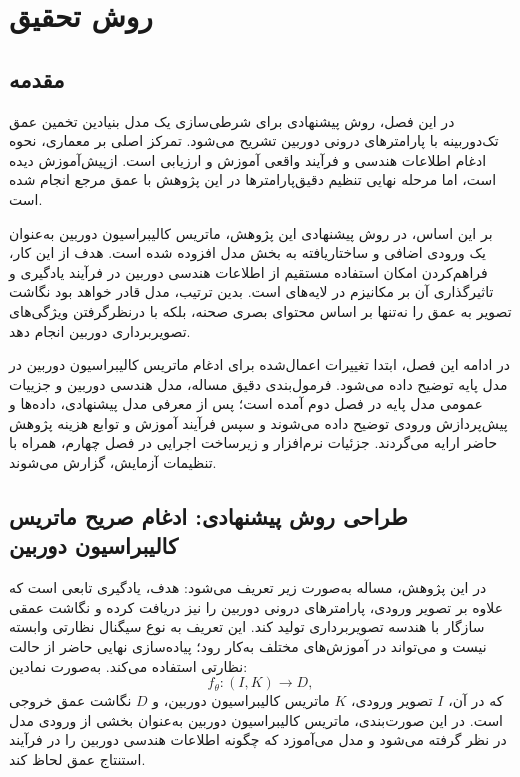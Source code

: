 \chapter{روش تحقیق}
\thispagestyle{fancy}\clearpage
\section{مقدمه}

در این فصل، روش پیشنهادی برای شرطی‌سازی یک مدل بنیادین تخمین عمق تک‌دوربینه با پارامترهای درونی دوربین تشریح می‌شود. تمرکز اصلی بر معماری، نحوه ادغام اطلاعات هندسی و فرآیند واقعی آموزش و ارزیابی است. \basemodel{} ازپیش‌آموزش دیده است، اما مرحله نهایی تنظیم دقیق‌پارامترها در این پژوهش با عمق مرجع انجام شده است.

بر این اساس، در روش پیشنهادی این پژوهش، ماتریس کالیبراسیون دوربین به‌عنوان یک ورودی اضافی و ساختاریافته به بخش  مدل افزوده شده است. هدف از این کار، فراهم‌کردن امکان استفاده مستقیم از اطلاعات هندسی دوربین در فرآیند یادگیری و تاثیرگذاری آن بر مکانیزم  در لایه‌های  است. بدین ترتیب، مدل قادر خواهد بود نگاشت تصویر به عمق را نه‌تنها بر اساس محتوای بصری صحنه، بلکه با درنظرگرفتن ویژگی‌های تصویربرداری دوربین انجام دهد.

در ادامه این فصل، ابتدا  تغییرات اعمال‌شده برای ادغام ماتریس کالیبراسیون دوربین در مدل پایه توضیح داده می‌شود. فرمول‌بندی دقیق مساله، مدل هندسی دوربین و جزییات عمومی مدل پایه در فصل دوم آمده است؛ پس از معرفی مدل پیشنهادی، داده‌ها و پیش‌پردازش ورودی توضیح داده می‌شوند و سپس فرآیند آموزش و توابع هزینه پژوهش حاضر ارایه می‌گردند. جزئیات نرم‌افزار و زیرساخت اجرایی در فصل چهارم، همراه با تنظیمات آزمایش، گزارش می‌شوند.









\section{طراحی روش پیشنهادی: ادغام صریح ماتریس کالیبراسیون دوربین}

در این پژوهش، مساله به‌صورت زیر تعریف می‌شود: هدف، یادگیری تابعی است که علاوه بر تصویر ورودی، پارامترهای درونی دوربین را نیز دریافت کرده و نگاشت عمقی سازگار با هندسه تصویربرداری تولید کند. این تعریف به نوع سیگنال نظارتی وابسته نیست و می‌تواند در آموزش‌های مختلف به‌کار رود؛ پیاده‌سازی نهایی حاضر از حالت نظارتی استفاده می‌کند. به‌صورت نمادین:
\begin{equation}
f_{\theta} : (I, K) \rightarrow D,
\end{equation}
که در آن، $I$ تصویر ورودی، $K$ ماتریس کالیبراسیون دوربین، و $D$ نگاشت عمق خروجی است. در این صورت‌بندی، ماتریس کالیبراسیون دوربین به‌عنوان بخشی از ورودی مدل در نظر گرفته می‌شود و مدل می‌آموزد که چگونه اطلاعات هندسی دوربین را در فرآیند استنتاج عمق لحاظ کند.


